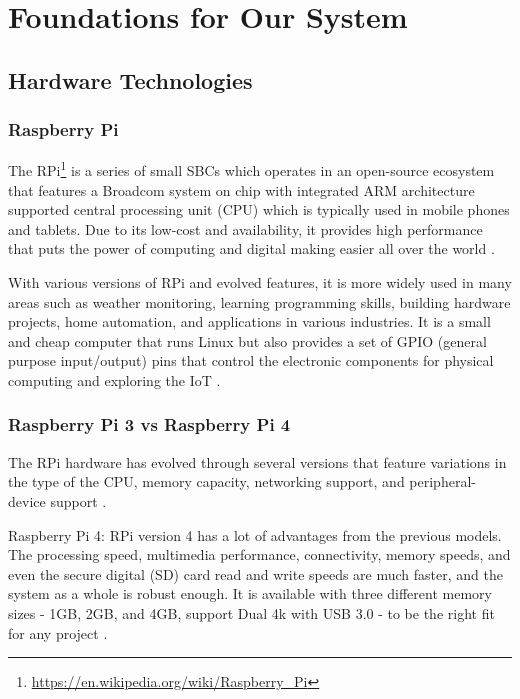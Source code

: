 \section{Foundations for Our System}

\subsection{Hardware Technologies}

\subsubsection{Raspberry Pi}
The RPi\footnote{\url{https://en.wikipedia.org/wiki/Raspberry_Pi}} is a series of small SBCs which operates in an open-source ecosystem that features a Broadcom system on chip with integrated ARM architecture supported central processing unit (CPU) which is typically used in mobile phones and tablets. Due to its low-cost and availability, it provides high performance that puts the power of computing and digital making easier all over the world \cite{wiki}.\par

With various versions of RPi and evolved features, it is more widely used in many areas such as weather monitoring, learning programming skills, building hardware projects, home automation, and applications in various industries. It is a small and cheap computer that runs Linux but also provides a set of GPIO (general purpose input/output) pins that control the electronic components for physical computing and exploring the IoT \cite{Rpi}.

\subsubsection{Raspberry Pi 3 vs Raspberry Pi 4}
The RPi hardware has evolved through several versions that feature variations in the type of the CPU, memory capacity, networking support, and peripheral-device support \cite{wiki}. \par

Raspberry Pi 4: 
RPi version 4 has a lot of advantages from the previous models. The processing speed, multimedia performance, connectivity, memory speeds, and even the secure digital (SD) card read and write speeds are much faster, and the system as a whole is robust enough. It is available with three different memory sizes - 1GB, 2GB, and 4GB, support Dual 4k with USB 3.0 - to be the right fit for any project \cite{PI}. \par

